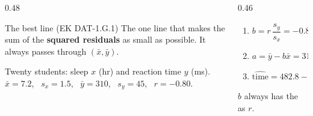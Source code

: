\documentclass[aspectratio=169, 11pt]{beamer}
\begin{document}
\begin{frame}[t, plain]
  \vspace{2pt}
  \begin{columns}[t]
    \begin{column}{0.48\textwidth}
      \begin{block}{The best line (EK DAT-1.G.1)}
        The one line that makes the sum of the \textbf{squared residuals} as small as
        possible. It always passes through $(\bar x, \bar y)$.
      \end{block}
      \vspace{4pt}
      {\small Twenty students: sleep $x$ (hr) and reaction time $y$ (ms).\\
      $\bar x = 7.2$, \ $s_x = 1.5$, \ $\bar y = 310$, \ $s_y = 45$, \ $r = -0.80$.}
    \end{column}
    \begin{column}{0.46\textwidth}
      \begin{enumerate}\setlength{\itemsep}{6pt}
        \item $b = r\,\dfrac{s_y}{s_x} = -0.80 \cdot \dfrac{45}{1.5} = -24$
        \item $a = \bar y - b\bar x = 310 - (-24)(7.2) = 482.8$
        \item $\widehat{\text{time}} = 482.8 - 24(\text{sleep})$
      \end{enumerate}
      \vspace{4pt}
      {\small $b$ always has the  as $r$.}
    \end{column}
  \end{columns}
\end{frame}
\end{document}
